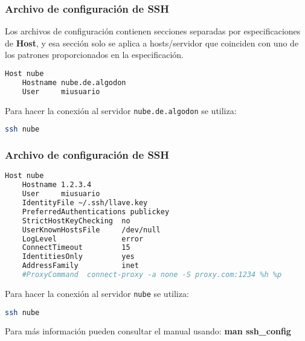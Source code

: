\begin{frame}[fragile]
  \frametitle{Archivo de configuración de SSH}

  Los archivos de configuración contienen secciones separadas por
  especificaciones de \textbf{Host}, y esa sección solo se aplica
  a hosts/servidor que coinciden con uno de los patrones
  proporcionados en la especificación.

  \vspace{\baselineskip}
  \begin{lstlisting}[language=Bash,basicstyle={\footnotesize\ttfamily}]
Host nube
    Hostname nube.de.algodon
    User     miusuario
  \end{lstlisting}

  \pause
  \vspace{\baselineskip}
  Para hacer la conexión al servidor \texttt{nube.de.algodon} se utiliza:
  \begin{lstlisting}[language=Bash]
ssh nube
  \end{lstlisting}
\end{frame}

\begin{frame}[fragile]
  \frametitle{Archivo de configuración de SSH}

  \begin{lstlisting}[language=Bash,basicstyle={\footnotesize\ttfamily}]
Host nube
    Hostname 1.2.3.4
    User     miusuario
    IdentityFile ~/.ssh/llave.key
    PreferredAuthentications publickey
    StrictHostKeyChecking  no
    UserKnownHostsFile     /dev/null
    LogLevel               error
    ConnectTimeout         15
    IdentitiesOnly         yes
    AddressFamily          inet
    #ProxyCommand  connect-proxy -a none -S proxy.com:1234 %h %p
  \end{lstlisting}

  Para hacer la conexión al servidor \texttt{nube} se utiliza:
  \begin{lstlisting}[language=Bash]
ssh nube
  \end{lstlisting}

  Para más información pueden consultar el manual usando:
  \textbf{man ssh\_config}
\end{frame}

